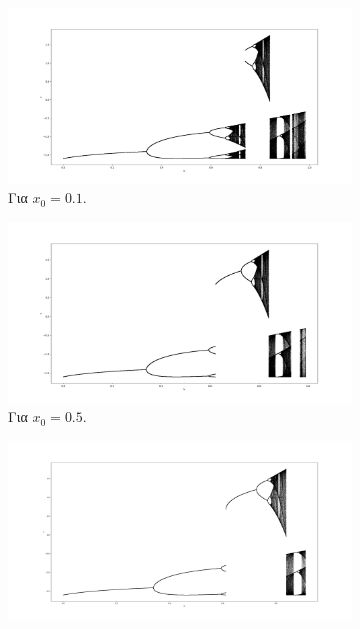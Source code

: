 \begin{figure}[h!]
	\centering
	
	\begin{subfigure}[b]{0.7\textwidth}
		\centering
		\includegraphics[width=\textwidth]{LateX images/graphs q16/g1}
		\caption{Για \(x_0=0.1\).}
		\label{f:g27}
	\end{subfigure}
	\hfill
	\begin{subfigure}[b]{0.7\textwidth}
		\centering
		\includegraphics[width=\textwidth]{LateX images/graphs q16/g2}
		\caption{Για \(x_0=0.5\).}
		\label{f:g28}
	\end{subfigure}
	\hfill
	\begin{subfigure}[b]{0.7\textwidth}
		\centering
		\includegraphics[width=\textwidth]{LateX images/graphs q16/g3}

\end{subfigure}
\end{figure}
